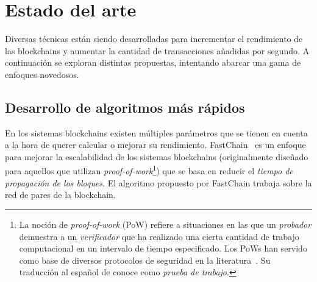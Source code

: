 
%

\section{Estado del arte}
Diversas técnicas están siendo desarrolladas para incrementar el rendimiento de las blockchains y
aumentar la cantidad de transacciones añadidas por segundo.
%
A continuación se exploran distintas propuestas, intentando abarcar una gama de enfoques novedosos.

\subsection{Desarrollo de algoritmos más rápidos}

En los sistemas blockchains existen múltiples parámetros que se tienen en cuenta
a la hora de querer calcular o mejorar su rendimiento.
%
FastChain~\cite{fastchain} es un enfoque para mejorar la escalabilidad de los sistemas blockchains
(originalmente diseñado para aquellos que utilizan \emph{proof-of-work}\footnote{La noción de
\emph{proof-of-work} (PoW) refiere a situaciones en las que un \emph{probador} demuestra a un \emph{verificador}
que ha realizado una cierta cantidad de trabajo computacional en un intervalo de tiempo especificado.
Los PoWs han servido como base de diversos protocolos de seguridad en la literatura~\cite{Jakobsson1999ProofsOW}.
Su traducción al español de conoce como \emph{prueba de trabajo}.})
que se basa en reducir el \emph{tiempo de propagación de los bloques}.
%
El algoritmo propuesto por FastChain trabaja sobre la red de pares de la blockchain.

